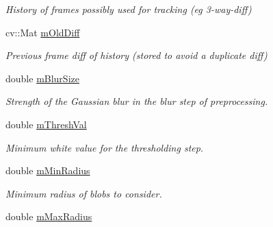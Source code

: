 \begin{DoxyCompactItemize}
\begin{DoxyCompactList}\small\item\em History of frames possibly used for tracking (eg 3-\/way-\/diff) \end{DoxyCompactList}\item 
cv\+::\+Mat \hyperlink{classKFBallTracker_aaa0ce8592271b6afa5ed2010be79977c}{m\+Old\+Diff}\hypertarget{classKFBallTracker_aaa0ce8592271b6afa5ed2010be79977c}{}\label{classKFBallTracker_aaa0ce8592271b6afa5ed2010be79977c}

\begin{DoxyCompactList}\small\item\em Previous frame diff of history (stored to avoid a duplicate diff) \end{DoxyCompactList}\item 
double \hyperlink{classKFBallTracker_a4ec3deef6c8bef0a9ffb5053cfe26a8a}{m\+Blur\+Size}\hypertarget{classKFBallTracker_a4ec3deef6c8bef0a9ffb5053cfe26a8a}{}\label{classKFBallTracker_a4ec3deef6c8bef0a9ffb5053cfe26a8a}

\begin{DoxyCompactList}\small\item\em Strength of the Gaussian blur in the blur step of preprocessing. \end{DoxyCompactList}\item 
double \hyperlink{classKFBallTracker_a5f18bc9f4f114668dca68094dc55ff12}{m\+Thresh\+Val}\hypertarget{classKFBallTracker_a5f18bc9f4f114668dca68094dc55ff12}{}\label{classKFBallTracker_a5f18bc9f4f114668dca68094dc55ff12}

\begin{DoxyCompactList}\small\item\em Minimum white value for the thresholding step. \end{DoxyCompactList}\item 
double \hyperlink{classKFBallTracker_a20e8f2930d632ce8456a5d00d3b243a1}{m\+Min\+Radius}\hypertarget{classKFBallTracker_a20e8f2930d632ce8456a5d00d3b243a1}{}\label{classKFBallTracker_a20e8f2930d632ce8456a5d00d3b243a1}

\begin{DoxyCompactList}\small\item\em Minimum radius of blobs to consider. \end{DoxyCompactList}\item 
double \hyperlink{classKFBallTracker_a780f286882f1866fbcf0d64b7757449d}{m\+Max\+Radius}\hypertarget{classKFBallTracker_a780f286882f1866fbcf0d64b7757449d}{}\label{classKFBallTracker_a780f286882f1866fbcf0d64b7757449d}


\end{DoxyCompactItemize}
